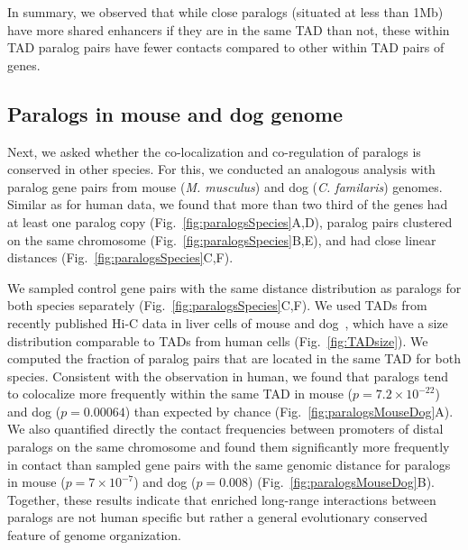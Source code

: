\documentclass[a4paper,twoside=true,openright,parskip=full,chapterprefix=true,11pt,headings=normal,bibliography=totoc,listof=totoc,titlepage=on,captions=tableabove,draft=false]{scrreprt}
\theoremstyle{definition}
\theoremstyle{definition}
\theoremstyle{definition}
\theoremstyle{remark}
\begin{document}
In summary, we observed that while close paralogs (situated at less than
1Mb) have more shared enhancers if they are in the same TAD than not,
these within TAD paralog pairs have fewer contacts compared to other
within TAD pairs of genes.

\hypertarget{paralogs-in-mouse-and-dog-genome}{%
\subsection{Paralogs in mouse and dog
genome}\label{paralogs-in-mouse-and-dog-genome}}

Next, we asked whether the co-localization and co-regulation of paralogs
is conserved in other species. For this, we conducted an analogous
analysis with paralog gene pairs from mouse (\emph{M. musculus}) and dog
(\emph{C. familaris}) genomes. Similar as for human data, we found that
more than two third of the genes had at least one paralog copy
(Fig.~\ref{fig:paralogsSpecies}A,D), paralog pairs clustered on the same
chromosome (Fig.~\ref{fig:paralogsSpecies}B,E), and had close linear
distances (Fig.~\ref{fig:paralogsSpecies}C,F).

We sampled control gene pairs with the same distance distribution as
paralogs for both species separately
(Fig.~\ref{fig:paralogsSpecies}C,F). We used TADs from recently
published Hi-C data in liver cells of mouse and
dog~\citep{VietriRudan2015}, which have a size distribution comparable
to TADs from human cells (Fig.~\ref{fig:TADsize}). We computed the
fraction of paralog pairs that are located in the same TAD for both
species. Consistent with the observation in human, we found that
paralogs tend to colocalize more frequently within the same TAD in mouse
(\(p=7.2 \times 10^{-22}\)) and dog (\(p=0.00064\)) than expected by
chance (Fig.~\ref{fig:paralogsMouseDog}A). We also quantified directly
the contact frequencies between promoters of distal paralogs on the same
chromosome and found them significantly more frequently in contact than
sampled gene pairs with the same genomic distance for paralogs in mouse
(\(p=7\times 10^{-7}\)) and dog (\(p=0.008\))
(Fig.~\ref{fig:paralogsMouseDog}B). Together, these results indicate
that enriched long-range interactions between paralogs are not human
specific but rather a general evolutionary conserved feature of genome
organization.
\end{document}

